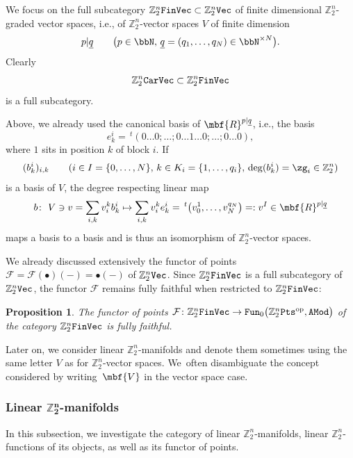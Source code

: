 \documentclass[10pt,a4paper]{amsart}
\newcommand{\op}[1]{\operatorname{#1}}
\newcommand{\Z}{{\mathbb Z}}
\def\ul{\underline}
\def\cF{\mathcal{F}}
\def\ul{\underline}
\newcommand{\0}{\otimes}
\newcommand{\z}{\Z_2^n}
\numberwithin{equation}{section}
\newtheorem{Proposition}[Theorem]{Proposition}
 { \theoremstyle{definition}
\newtheorem{Definition}[Theorem]{Definition}
\newtheorem{Example}[Theorem]{Example}
\newtheorem{Remark}[Theorem]{Remark} }
\begin{document}
We focus on the full subcategory $\Z_2^n{\tt FinVec}\subset\Z_2^n\tt Vec$ of finite dimensional $\Z_2^n$-graded vector spaces, i.e., of $\Z_2^n$-vector spaces $V$ of finite dimension
\[
p|\ul q\qquad \big(p\in\bbN,\, \ul{q}=(q_1,\dots,q_N)\in\bbN^{\times N}\big).
\]
Clearly
\[
\Z_2^n{\tt CarVec}\subset\Z_2^n \tt FinVec
\]
is a full subcategory.

Above, we already used the canonical basis of $\mbf{R}^{p|\ul q}$, i.e., the basis
\[
e^i_k=\,^t(0\dots 0;\dots;0\dots 1\dots 0;\dots;0\dots 0),
\]
where $1$ sits in position $k$ of block $i$. If
\[
(b^i_k)_{i,k}\qquad (i\in I=\{0,\dots,N\},\, k\in K_i=\{1,\dots,q_i\},\, \deg(b^i_k)=\zg_i\in\Z_2^n)
\]
is a basis of $V$, the degree respecting linear map
\begin{gather*}%
b\colon\ V\ni v=\sum_{i,k}v^k_ib^i_k\mapsto \sum_{i,k}v^k_ie^i_k=\,^t\big(v_0^1,\dots,v_N^{q_N}\big)=:v^I\in\mbf{R}^{p|\ul q}
\end{gather*}
maps a basis to a basis and is thus an isomorphism of $\Z_2^n$-vector spaces.

We already discussed extensively the functor of points $\cF= \cF(\bullet)(-)=\bullet(-)$ of $\z\tt Vec$. Since $\z\tt FinVec$ is a full subcategory of $\z\tt Vec$, the functor $\cF$ remains fully faithful when restricted to $\z\tt FinVec$:

\begin{Proposition}\label{FunPtsFinVecFF}
The functor of points $\cF\colon \z{\tt FinVec}\to{\tt Fun}_0\big(\z{\tt Pts}^{\op{op}},{\tt AMod}\big)$ of the category $\z{\tt FinVec}$ is fully faithful.
\end{Proposition}

\begin{Remark} Later on, we consider linear $\Z_2^n$-manifolds and denote them sometimes using the same letter $V$ as for $\Z_2^n$-vector spaces. We~often disambiguate the concept considered by writing~$\mbf{V}$ in the vector space case.
\end{Remark}

\newcommand{\sfl}{\textsf{L}}

\subsubsection[Linear Z2n-manifolds]{Linear $\boldsymbol{\Z_2^n}$-manifolds}

In this subsection, we investigate the category of linear $\z$-manifolds, linear $\z$-functions of its objects, as well as its functor of points.
\end{document}
